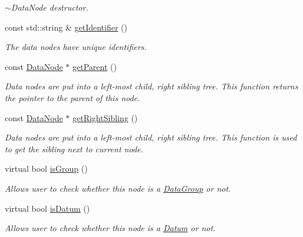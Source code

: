 \begin{DoxyCompactItemize}
\begin{DoxyCompactList}\small\item\em $\sim$\+Data\+Node destructor. \end{DoxyCompactList}\item 
const std\+::string \& \hyperlink{classDatabase_1_1DataNode_a428c4442fbdb48945dbd432c1f03ab60}{get\+Identifier} ()
\begin{DoxyCompactList}\small\item\em The data nodes have unique identifiers. \end{DoxyCompactList}\item 
const \hyperlink{classDatabase_1_1DataNode}{Data\+Node} $\ast$ \hyperlink{classDatabase_1_1DataNode_a888e0c17ef05ffbf2e332e15c7636209}{get\+Parent} ()
\begin{DoxyCompactList}\small\item\em Data nodes are put into a left-\/most child, right sibling tree. This function returns the pointer to the parent of this node. \end{DoxyCompactList}\item 
const \hyperlink{classDatabase_1_1DataNode}{Data\+Node} $\ast$ \hyperlink{classDatabase_1_1DataNode_a09d6674f389f8d528cea37326cfe9037}{get\+Right\+Sibling} ()
\begin{DoxyCompactList}\small\item\em Data nodes are put into a left-\/most child, right sibling tree. This function is used to get the sibling next to current node. \end{DoxyCompactList}\item 
virtual bool \hyperlink{classDatabase_1_1DataNode_a996e222a24c6f3e1bc646fe31e26af1b}{is\+Group} ()
\begin{DoxyCompactList}\small\item\em Allows user to check whether this node is a \hyperlink{classDatabase_1_1DataGroup}{Data\+Group} or not. \end{DoxyCompactList}\item 
virtual bool \hyperlink{classDatabase_1_1DataNode_afc96c4a3acb58cb1afb68ebaae43d0ae}{is\+Datum} ()
\begin{DoxyCompactList}\small\item\em Allows user to check whether this node is a \hyperlink{classDatabase_1_1Datum}{Datum} or not. \end{DoxyCompactList}\end{DoxyCompactItemize}
